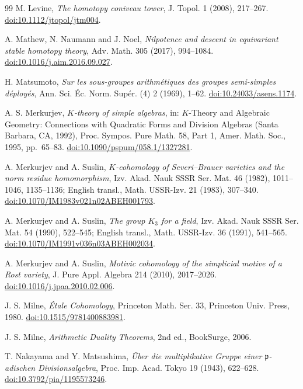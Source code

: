 \begin{thebibliography}{99}
 M. Levine,
\emph{The homotopy coniveau tower},
J. Topol. 1 (2008), 217--267.
\href{https://doi.org/10.1112/jtopol/jtm004}{doi:10.1112/jtopol/jtm004}.

 A. Mathew, N. Naumann and J. Noel,
\emph{Nilpotence and descent in equivariant stable homotopy theory},
Adv. Math. 305 (2017), 994--1084.
\href{https://doi.org/10.1016/j.aim.2016.09.027}{doi:10.1016/j.aim.2016.09.027}.

 H. Matsumoto,
\emph{Sur les sous-groupes arithmétiques des groupes semi-simples déployés},
Ann. Sci. Éc. Norm. Supér. (4) 2 (1969), 1--62.
\href{https://doi.org/10.24033/asens.1174}{doi:10.24033/asens.1174}.

 A. S. Merkurjev,
\emph{$K$-theory of simple algebras},
in: $K$-Theory and Algebraic Geometry: Connections with Quadratic Forms and Division Algebras (Santa Barbara, CA, 1992), Proc. Sympos. Pure Math. 58, Part 1, Amer. Math. Soc., 1995, pp.~65--83.
\href{https://doi.org/10.1090/pspum/058.1/1327281}{doi:10.1090/pspum/058.1/1327281}.

 A. Merkurjev and A. Suslin,
\emph{$K$-cohomology of Severi--Brauer varieties and the norm residue homomorphism},
Izv. Akad. Nauk SSSR Ser. Mat. 46 (1982), 1011--1046, 1135--1136;
English transl., Math. USSR-Izv. 21 (1983), 307--340.
\href{https://doi.org/10.1070/IM1983v021n02ABEH001793}{doi:10.1070/IM1983v021n02ABEH001793}.

 A. Merkurjev and A. Suslin,
\emph{The group $K_3$ for a field},
Izv. Akad. Nauk SSSR Ser. Mat. 54 (1990), 522--545;
English transl., Math. USSR-Izv. 36 (1991), 541--565.
\href{https://doi.org/10.1070/IM1991v036n03ABEH002034}{doi:10.1070/IM1991v036n03ABEH002034}.

 A. Merkurjev and A. Suslin,
\emph{Motivic cohomology of the simplicial motive of a Rost variety},
J. Pure Appl. Algebra 214 (2010), 2017--2026.
\href{https://doi.org/10.1016/j.jpaa.2010.02.006}{doi:10.1016/j.jpaa.2010.02.006}.

 J. S. Milne,
\emph{\'Etale Cohomology},
Princeton Math. Ser. 33, Princeton Univ. Press, 1980.
\href{https://doi.org/10.1515/9781400883981}{doi:10.1515/9781400883981}.

 J. S. Milne,
\emph{Arithmetic Duality Theorems},
2nd ed., BookSurge, 2006.

 T. Nakayama and Y. Matsushima,
\emph{\"Uber die multiplikative Gruppe einer $\mathfrak p$-adischen Divisionsalgebra},
Proc. Imp. Acad. Tokyo 19 (1943), 622--628.
\href{https://doi.org/10.3792/pia/1195573246}{doi:10.3792/pia/1195573246}.


\end{thebibliography}
